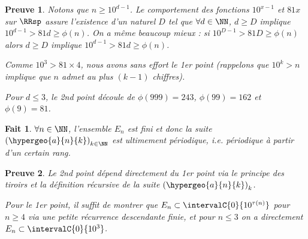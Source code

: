 \documentclass[12pt]{amsart}
\DeclareMathOperator{\taille}{\tau}
\newtheorem{fact}{Fait}
\newtheorem*{proof*}{Preuve}
\begin{document}
\begin{proof*}
	Notons que $n \geqslant 10^{d-1}$.
	Le comportement des fonctions $10^{x-1}$ et $81x$ sur $\RRsp$ assure l'existence d'un naturel $D$ tel que $\forall d \in \NN$, $d \geqslant D$ implique $10^{d-1} > 81d \geqslant \phi(n)$. On a même beaucoup mieux : si $10^{D-1} > 81D \geqslant \phi(n)$ alors $d \geqslant D$ implique $10^{d-1} > 81d \geqslant \phi(n)$.
	
	\medskip
	
	Comme $10^3 > 81 \times 4$, nous avons sans effort le 1er point (rappelons que $10^k > n$ implique que $n$ admet au plus $(k-1)$ chiffres).
	
	\medskip
	
	Pour $d \leqslant 3$, le 2nd point découle de $\phi(999) = 243$, $\phi(99) = 162$ et $\phi(9) = 81$.
\end{proof*}



\medskip

\begin{fact}
	$\forall n \in \NN$, l'ensemble $E_n$ est fini et donc la suite $\left( \hypergeo{a}{n}{k} \right)_{k \in \NN}$ est ultimement périodique, i.e. périodique à partir d'un certain rang.
\end{fact}

\begin{proof*}
	Le 2nd point dépend directement du 1er point via le principe des tiroirs et la définition récursive de la suite $\left( \hypergeo{a}{n}{k} \right)_k$.
	
	\medskip
	
	Pour le 1er point, il suffit de montrer que $E_n \subset \intervalC{0}{10^{\taille(n)}}$ pour $n \geqslant 4$ via une petite récurrence descendante finie, et pour $n \leqslant 3$ on a directement $E_n \subset \intervalC{0}{10^3}$.
\end{proof*}
\end{document}
